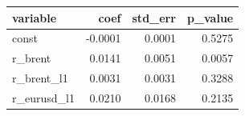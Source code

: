 \begin{tabular}{lrrr}
\toprule
variable & coef & std\_err & p\_value \\
\midrule
const & -0.0001 & 0.0001 & 0.5275 \\
r\_brent & 0.0141 & 0.0051 & 0.0057 \\
r\_brent\_l1 & 0.0031 & 0.0031 & 0.3288 \\
r\_eurusd\_l1 & 0.0210 & 0.0168 & 0.2135 \\
\bottomrule
\end{tabular}

